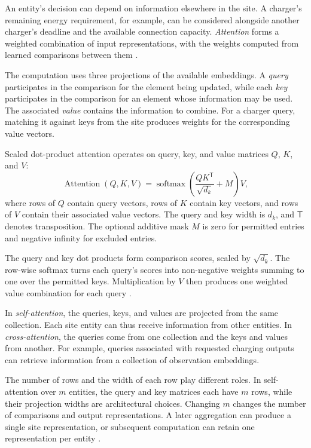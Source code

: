 An entity's decision can depend on information elsewhere in the site. A charger's remaining energy requirement, for example, can be considered alongside another charger's deadline and the available connection capacity. \emph{Attention} forms a weighted combination of input representations, with the weights computed from learned comparisons between them \parencite{vaswani2017attention}.

The computation uses three projections of the available embeddings. A \emph{query} participates in the comparison for the element being updated, while each \emph{key} participates in the comparison for an element whose information may be used. The associated \emph{value} contains the information to combine. For a charger query, matching it against keys from the site produces weights for the corresponding value vectors.

Scaled dot-product attention operates on query, key, and value matrices $Q$, $K$, and $V$:
\begin{equation}
\operatorname{Attention}(Q,K,V)
=\operatorname{softmax}\!\left(\frac{QK^{\mathsf T}}{\sqrt{d_k}}+M\right)V,
\label{eq:ch2-attention}
\end{equation}
where rows of $Q$ contain query vectors, rows of $K$ contain key vectors, and rows of $V$ contain their associated value vectors. The query and key width is $d_k$, and $\mathsf T$ denotes transposition. The optional additive mask $M$ is zero for permitted entries and negative infinity for excluded entries.

The query and key dot products form comparison scores, scaled by $\sqrt{d_k}$. The row-wise softmax turns each query's scores into non-negative weights summing to one over the permitted keys. Multiplication by $V$ then produces one weighted value combination for each query \parencite{vaswani2017attention}.

In \emph{self-attention}, the queries, keys, and values are projected from the same collection. Each site entity can thus receive information from other entities. In \emph{cross-attention}, the queries come from one collection and the keys and values from another. For example, queries associated with requested charging outputs can retrieve information from a collection of observation embeddings.

The number of rows and the width of each row play different roles. In self-attention over $m$ entities, the query and key matrices each have $m$ rows, while their projection widths are architectural choices. Changing $m$ changes the number of comparisons and output representations. A later aggregation can produce a single site representation, or subsequent computation can retain one representation per entity \parencite{lee2019settransformer}.

